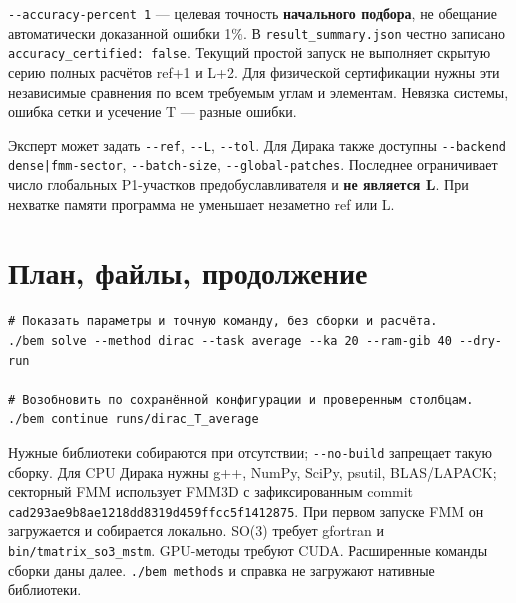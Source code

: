 \documentclass[
  russian,
  11pt,
  a4paper,
]{report}
\begin{document}
\nolinkurl{--accuracy-percent 1} --- целевая точность \textbf{начального
подбора}, не обещание автоматически доказанной ошибки 1\%. В
\nolinkurl{result_summary.json} честно записано
\nolinkurl{accuracy_certified: false}. Текущий простой запуск не
выполняет скрытую серию полных расчётов ref+1 и L+2. Для физической
сертификации нужны эти независимые сравнения по всем требуемым углам и
элементам. Невязка системы, ошибка сетки и усечение T --- разные ошибки.

Эксперт может задать \nolinkurl{--ref}, \nolinkurl{--L},
\nolinkurl{--tol}. Для Дирака также доступны
\nolinkurl{--backend dense|fmm-sector}, \nolinkurl{--batch-size},
\nolinkurl{--global-patches}. Последнее ограничивает число глобальных
P1-участков предобуславливателя и \textbf{не является L}. При нехватке
памяти программа не уменьшает незаметно ref или L.

\section{План, файлы,
продолжение}\label{ux43fux43bux430ux43d-ux444ux430ux439ux43bux44b-ux43fux440ux43eux434ux43eux43bux436ux435ux43dux438ux435}

\begin{verbatim}
# Показать параметры и точную команду, без сборки и расчёта.
./bem solve --method dirac --task average --ka 20 --ram-gib 40 --dry-run

# Возобновить по сохранённой конфигурации и проверенным столбцам.
./bem continue runs/dirac_T_average
\end{verbatim}

Нужные библиотеки собираются при отсутствии; \nolinkurl{--no-build}
запрещает такую сборку. Для CPU Дирака нужны g++, NumPy, SciPy, psutil,
BLAS/LAPACK; секторный FMM использует FMM3D с зафиксированным commit
\nolinkurl{cad293ae9b8ae1218dd8319d459ffcc5f1412875}. При первом запуске
FMM он загружается и собирается локально. SO(3) требует gfortran и
\nolinkurl{bin/tmatrix_so3_mstm}. GPU-методы требуют CUDA. Расширенные
команды сборки даны далее. \nolinkurl{./bem methods} и справка не
загружают нативные библиотеки.
\end{document}
